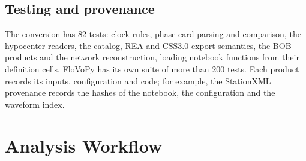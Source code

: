 \documentclass[linenum]{SSA-SRL}
\begin{document}
\subsection{Testing and provenance}

The conversion has 82 tests: clock rules, phase-card parsing and comparison, the hypocenter readers, the catalog, REA and CSS3.0 export semantics, the BOB products and the network reconstruction, loading notebook functions from their definition cells. FloVoPy has its own suite of more than 200 tests. Each product records its inputs, configuration and code; for example, the StationXML provenance records the hashes of the notebook, the configuration and the waveform index.

\section{Analysis Workflow}
\end{document}
